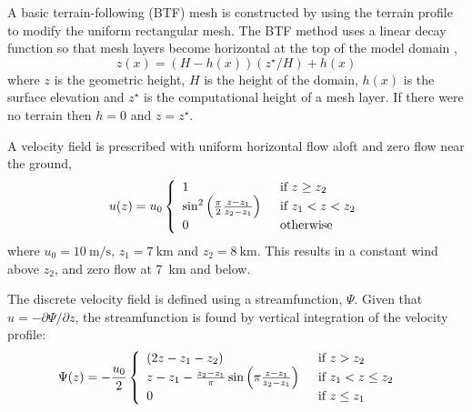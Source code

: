 A basic terrain-following (BTF) mesh is constructed by using the terrain profile to modify the uniform rectangular mesh.
The BTF method uses a linear decay function so that mesh layers become horizontal at the top of the model domain \citep{galchen-somerville1975a},
\begin{equation}
	z(x) = \left( H - h(x) \right) \left( z^\star / H \right) + h(x) \label{eqn:btf}
\end{equation}
where $z$ is the geometric height, $H$ is the height of the domain, $h(x)$ is the surface elevation and $z^\star$ is the computational height of a mesh layer.  If there were no terrain then $h = 0$ and $z = z^\star$.

A velocity field is prescribed with uniform horizontal flow aloft and zero flow near the ground,
\begin{align}
	u(z) = u_0 \left\{ \begin{array}{l l}
		1 & \enskip \text{if $z \geq z_2$} \\
		\sin^2 \left( \frac{\pi}{2} \frac{z - z_1}{z_2 - z_1} \right) & \enskip \text{if $z_1 < z < z_2$} \\
		0 & \enskip \text{otherwise}
	\end{array} \right.	
\end{align}
where $u_0 = \SI{10}{\meter\per\second}$, $z_1 = \SI{7}{\kilo\meter}$ and $z_2 = \SI{8}{\kilo\meter}$.
This results in a constant wind above $z_2$, and zero flow at \SI{7}{\kilo\meter} and below.

The discrete velocity field is defined using a streamfunction, \(\Psi\).  Given that \(u = -\partial \Psi / \partial z\), the streamfunction is found by vertical integration of the velocity profile:
\begin{align}
	\Psi(z) &= -\frac{u_0}{2} \left\{ \begin{array}{l l}
		\left( 2z - z_1 - z_2 \right) & \enskip \text{if $z > z_2$} \\
		z - z_1 - \frac{z_2 - z_1}{\pi} \sin \left(\pi \frac{z - z_1}{z_2-z_1}\right) & \enskip \text{if $z_1 < z \leq z_2$} \\
		0 & \enskip \text{if $z \leq z_1$}
	\end{array} \right.
\end{align}

